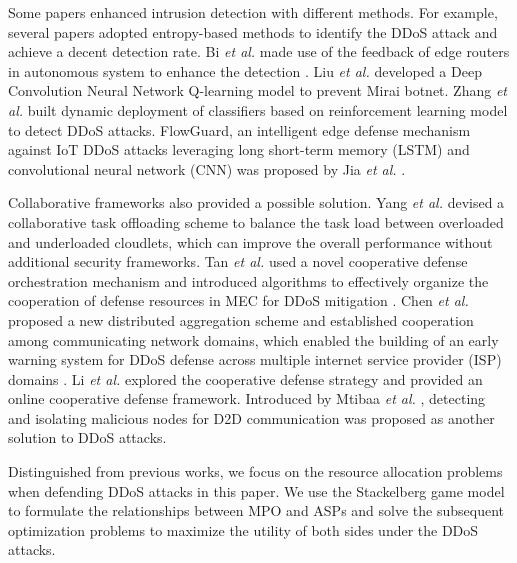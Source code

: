 \documentclass[conference]{IEEEtran}
\begin{document}
Some papers enhanced intrusion detection with different methods. For example, several papers adopted entropy-based methods to identify the DDoS attack and achieve a decent detection rate\cite{Wang}\cite{Xuanyuan}. Bi \emph{et al.} made use of the feedback of edge routers in autonomous system to enhance the detection \cite{Bi}. Liu \emph{et al.} developed a Deep Convolution Neural Network Q-learning model to prevent Mirai botnet\cite{Liu}. Zhang \emph{et al.} built dynamic deployment of classifiers based on reinforcement learning model to detect DDoS attacks\cite{Zhang}. FlowGuard, an intelligent edge defense mechanism against IoT DDoS attacks leveraging long short-term memory (LSTM) and convolutional neural network (CNN) \cite{Jia} was proposed by Jia \emph{et al.} .

Collaborative frameworks also provided a possible solution. Yang \emph{et al.} devised a collaborative task offloading scheme to balance the task load between overloaded and underloaded cloudlets, which can improve the overall performance without additional security frameworks\cite{Yang}. Tan \emph{et al.} used a novel cooperative defense orchestration mechanism and introduced algorithms to effectively organize the cooperation of defense resources in MEC for DDoS mitigation \cite{Tan}. Chen \emph{et al.} proposed a new distributed aggregation scheme and established cooperation among communicating network
domains, which enabled the building of an early warning
system for DDoS defense across multiple internet service provider (ISP) domains \cite{Chen}. Li \emph{et al.} explored the cooperative defense strategy and provided an online cooperative defense framework\cite{Li}. Introduced by Mtibaa \emph{et al.} , detecting and isolating malicious nodes for D2D communication was proposed as another solution to DDoS attacks\cite{Mtibaa}. 

Distinguished from previous works, we focus on the resource allocation problems when defending DDoS attacks in this paper. We use the Stackelberg game model to formulate
the relationships between MPO and ASPs and solve the subsequent optimization problems to maximize the utility of both sides under the DDoS attacks. 
\end{document}
